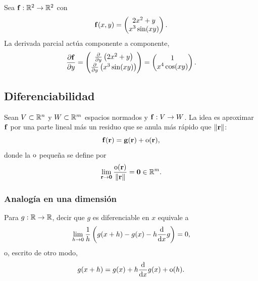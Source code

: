 \begin{ejemplo}
  \label{ej:parcial_vectorial}
  Sea $\mathbf{f}:\mathbb{R}^2\rightarrow\mathbb{R}^2$ con
  \begin{equation}
    \label{eq:f_vectorial}
    \mathbf{f}(x,y)=
    \begin{pmatrix}
      2x^2+y\\
      x^3\sin(xy)
    \end{pmatrix}.
  \end{equation}
  La derivada parcial act\'ua componente a componente,
  \begin{equation}
    \label{eq:parcial_vectorial}
    \frac{\partial \mathbf{f}}{\partial y}=
    \begin{pmatrix}
      \frac{\partial }{\partial y}\left( 2x^2+y \right)\\[2pt]
      \frac{\partial }{\partial y}\left( x^3\sin(xy) \right)
    \end{pmatrix}
    =
    \begin{pmatrix}
      1\\
      x^4\cos(xy)
    \end{pmatrix}.
  \end{equation}
\end{ejemplo}

\subsection{Diferenciabilidad}
\label{subsec:diferenciabilidad}

Sean $V\subset\mathbb{R}^n$ y $W\subset\mathbb{R}^m$ espacios normados y
$\mathbf{f}:V\rightarrow W$. La idea es aproximar $\mathbf{f}$ por una parte lineal
m\'as un residuo que se anula m\'as r\'apido que $\lVert \mathbf{r} \rVert$:
\begin{equation}
  \label{eq:aproximacion_lineal}
  \mathbf{f}(\mathbf{r})=\mathbf{g}(\mathbf{r})+\mathrm{o}(\mathbf{r}),
\end{equation}
donde la $\mathrm{o}$ peque\~na se define por
\begin{equation}
  \label{eq:o_pequena}
  \lim_{\mathbf{r}\rightarrow\mathbf{0}}
    \frac{\mathrm{o}(\mathbf{r})}{\lVert \mathbf{r} \rVert}=\mathbf{0}\in\mathbb{R}^m .
\end{equation}

\subsubsection{Analog\'ia en una dimensi\'on}
\label{subsubsec:analogia_1d}

Para $g:\mathbb{R}\rightarrow\mathbb{R}$, decir que $g$ es diferenciable en $x$ equivale a
\begin{equation}
  \label{eq:diferenciable_1d}
  \lim_{h\rightarrow 0}\frac{1}{h}
    \left( g(x+h)-g(x)-h\frac{\mathrm{d}}{\mathrm{d}x}g \right)=0,
\end{equation}
o, escrito de otro modo,
\begin{equation}
  \label{eq:diferenciable_1d_bis}
  g(x+h)=g(x)+h\frac{\mathrm{d}}{\mathrm{d}x}g(x)+\mathrm{o}(h).
\end{equation}

